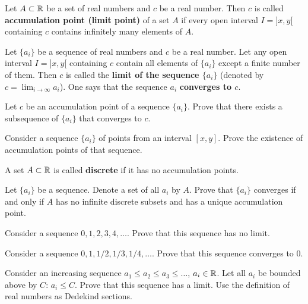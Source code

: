 \documentclass[12pt]{article}
\begin{document}
\begin{opredelenie} Let $A\subset {\mathbb R}$ be a set of real numbers and $c$
  be a real number. Then $c$ is called {\bf accumulation point
    (limit point)} of a set $A$ if every open interval $I = ]x,
  y[$ containing $c$ contains infinitely many elements of $A$.
\end{opredelenie}

\begin{opredelenie} Let $\{a_i\}$ be a sequence of real numbers and
  $c$ be a real number. Let any open interval $I = ]x, y[$
  containing $c$ contain all elements of $\{a_i\}$ except a
  finite number of them. Then $c$ is called the {\bf limit of the sequence
    $\{a_i\}$} (denoted by $c = \lim_{i \to \infty} a_i $). One says
  that the sequence $a_i$ {\bf converges to $c$}.
\end{opredelenie}

\begin{zadacha} Let $c$ be an accumulation point of a sequence
  $\{a_i\}$. Prove that there exists a subsequence of $\{a_i\}$ that
  converges to $c$.
\end{zadacha}

\begin{zadacha}[*] Consider a sequence $\{a_i\}$ of points from an
  interval $[x,y]$. Prove the existence of accumulation points of that
  sequence.
\end{zadacha}

\begin{opredelenie} A set $A\subset {\mathbb R}$ is called {\bf
discrete} if it has no accumulation points.
\end{opredelenie}

\begin{zadacha}[*] Let $\{a_i\}$ be a sequence. Denote a set of all
  $a_i$ by $A$.  Prove that $\{a_i\}$ converges if and only if $A$ has
  no infinite discrete subsets and has a unique accumulation point.
\end{zadacha}

\begin{zadacha} Consider a sequence $0, 1, 2, 3, 4,
\ldots$. Prove that this sequence has no limit.
\end{zadacha}

\begin{zadacha} Consider a sequence  $0, 1, 1/2, 1/3, 1/4,
\ldots$. Prove that this sequence converges to 0.
\end{zadacha}

\begin{zadacha} Consider an increasing sequence
$a_1\leq a_2 \leq a_3 \leq \ldots$, $a_i\in {\mathbb R}$. Let all 
$a_i$ be bounded above by $C$: $a_i \leq
C$. Prove that this sequence has a limit. Use the definition of real
numbers as Dedekind sections.
\end{zadacha}
\end{document}

